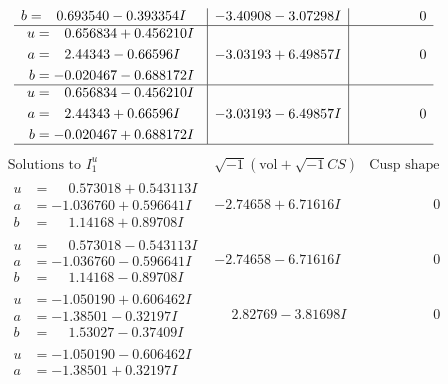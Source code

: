 \documentclass[1p]{elsarticle_modified}
\theoremstyle{definition}
\newcommand{\I}{\sqrt{-1}}
\begin{document}
$$\begin{array}{c|c|c}
\begin{aligned}
b &= \phantom{-}0.693540 - 0.393354 I\end{aligned}
 & -3.40908 - 3.07298 I & \phantom{-0.000000 } 0 \\ \hline\begin{aligned}
u &= \phantom{-}0.656834 + 0.456210 I \\
a &= \phantom{-}2.44343 - 0.66596 I \\
b &= -0.020467 - 0.688172 I\end{aligned}
 & -3.03193 + 6.49857 I & \phantom{-0.000000 } 0 \\ \hline\begin{aligned}
u &= \phantom{-}0.656834 - 0.456210 I \\
a &= \phantom{-}2.44343 + 0.66596 I \\
b &= -0.020467 + 0.688172 I\end{aligned}
 & -3.03193 - 6.49857 I & \phantom{-0.000000 } 0\\
 \hline 
 \end{array}$$\newpage$$\begin{array}{c|c|c}  
\text{Solutions to }I^u_{1}& \I (\text{vol} + \sqrt{-1}CS) & \text{Cusp shape}\\
 \hline 
\begin{aligned}
u &= \phantom{-}0.573018 + 0.543113 I \\
a &= -1.036760 + 0.596641 I \\
b &= \phantom{-}1.14168 + 0.89708 I\end{aligned}
 & -2.74658 + 6.71616 I & \phantom{-0.000000 } 0 \\ \hline\begin{aligned}
u &= \phantom{-}0.573018 - 0.543113 I \\
a &= -1.036760 - 0.596641 I \\
b &= \phantom{-}1.14168 - 0.89708 I\end{aligned}
 & -2.74658 - 6.71616 I & \phantom{-0.000000 } 0 \\ \hline\begin{aligned}
u &= -1.050190 + 0.606462 I \\
a &= -1.38501 - 0.32197 I \\
b &= \phantom{-}1.53027 - 0.37409 I\end{aligned}
 & \phantom{-}2.82769 - 3.81698 I & \phantom{-0.000000 } 0 \\ \hline\begin{aligned}
u &= -1.050190 - 0.606462 I \\
a &= -1.38501 + 0.32197 I \\

\end{aligned}
\end{array}$$
\end{document}
